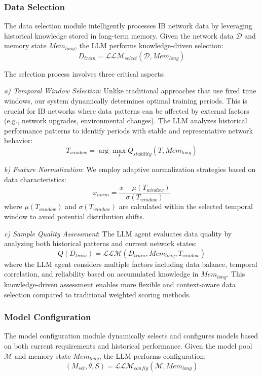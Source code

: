 \documentclass[conference]{IEEEtran}
\begin{document}
\subsubsection{Data Selection}
The data selection module intelligently processes IB network data by leveraging historical knowledge stored in long-term memory. Given the network data $\mathcal{D}$ and memory state $Mem_{long}$, the LLM performs knowledge-driven selection:
\begin{equation}
    D_{train} = \mathcal{LLM}_{select}(\mathcal{D}, Mem_{long})
\end{equation}

The selection process involves three critical aspects:

\textit{a) Temporal Window Selection}: Unlike traditional approaches that use fixed time windows, our system dynamically determines optimal training periods. This is crucial for IB networks where data patterns can be affected by external factors (e.g., network upgrades, environmental changes). The LLM analyzes historical performance patterns to identify periods with stable and representative network behavior:
\begin{equation}
    T_{window} = \arg\max_T Q_{stability}(T, Mem_{long})
\end{equation}

\textit{b) Feature Normalization}: We employ adaptive normalization strategies based on data characteristics:
\begin{equation}
    x_{norm} = \frac{x - \mu(T_{window})}{\sigma(T_{window})}
\end{equation}
where $\mu(T_{window})$ and $\sigma(T_{window})$ are calculated within the selected temporal window to avoid potential distribution shifts.

\textit{c) Sample Quality Assessment}: The LLM agent evaluates data quality by analyzing both historical patterns and current network states:
\begin{equation}
    Q(D_{train}) = \mathcal{LLM}(D_{train}, Mem_{long}, T_{window})
\end{equation}
where the LLM agent considers multiple factors including data balance, temporal correlation, and reliability based on accumulated knowledge in $Mem_{long}$. This knowledge-driven assessment enables more flexible and context-aware data selection compared to traditional weighted scoring methods.

\subsubsection{Model Configuration}
The model configuration module dynamically selects and configures models based on both current requirements and historical performance. Given the model pool $\mathcal{M}$ and memory state $Mem_{long}$, the LLM performs configuration:
\begin{equation}
    (M_{set}, \theta, S) = \mathcal{LLM}_{config}(\mathcal{M}, Mem_{long})
\end{equation}
\end{document}
